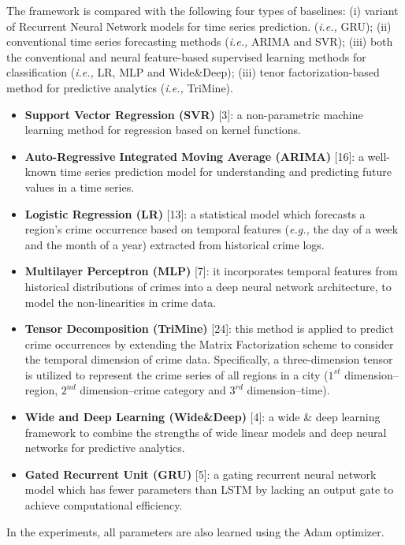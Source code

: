 The framework is compared with the following four
types of baselines: (i) variant of Recurrent Neural Network models for time series prediction. (\emph{i.e.,} GRU); (ii) conventional time
series forecasting methods (\emph{i.e.,} ARIMA and SVR); (iii) both the
conventional and neural feature-based supervised learning methods for classification (\emph{i.e.,} LR, MLP and Wide\&Deep); (iii) tenor
factorization-based method for predictive analytics (\emph{i.e.,} TriMine).
\newpage
\begin{itemize}
    \item \textbf{Support Vector Regression (SVR)} [3]: a non-parametric machine learning method for regression based on kernel functions.
    
    \item \textbf{Auto-Regressive Integrated Moving Average (ARIMA)} [16]: a well-known time series prediction model for understanding
    and predicting future values in a time series.
    
    \item \textbf{Logistic Regression (LR)} [13]:  a statistical model which forecasts a region’s crime occurrence based on temporal features
    (\emph{e.g.,} the day of a week and the month of a year) extracted from
    historical crime logs.
    
    \item \textbf{Multilayer Perceptron (MLP)} [7]: it incorporates temporal features from historical distributions of crimes into a deep neural
    network architecture, to model the non-linearities in crime data.
    
    \item \textbf{Tensor Decomposition (TriMine)} [24]: this method is applied
    to predict crime occurrences by extending the Matrix Factorization scheme to consider the temporal dimension of crime data.
    Specifically, a three-dimension tensor is utilized to represent the
    crime series of all regions in a city ($1^{st}$ dimension–region, $2^{nd}$
    dimension–crime category and $3^{rd}$ dimension–time).
    
    \item \textbf{Wide and Deep Learning (Wide\&Deep)} [4]:  a wide \& deep
    learning framework to combine the strengths of wide linear
    models and deep neural networks for predictive analytics.
    
    \item \textbf{Gated Recurrent Unit (GRU)} [5]:  a gating recurrent neural network model which has fewer parameters than LSTM by lacking
    an output gate to achieve computational efficiency.
\end{itemize}
In the experiments, all parameters are also learned using the Adam
optimizer.


